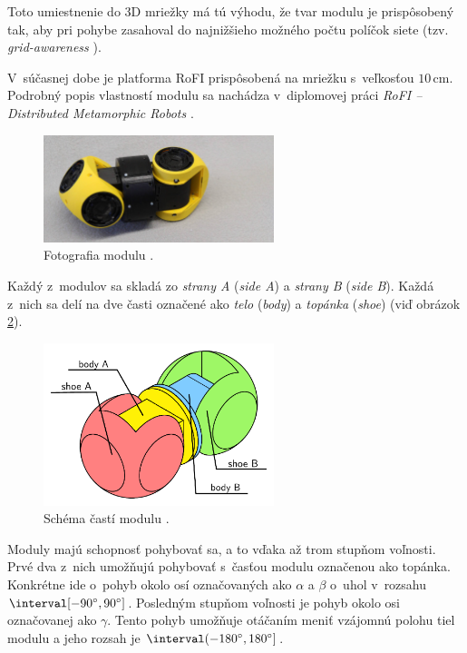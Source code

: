\documentclass[
  printed, %
  oneside, %
  notable,   %
  nolof,     %
  nolot,     %
]{fithesis3}
\begin{document}
Toto umiestnenie do 3D mriežky má tú výhodu, že tvar modulu je prispôsobený tak, aby pri pohybe zasahoval do najnižšieho možného počtu políčok siete (tzv. \textit{grid-awareness} \cite{mrazekMasterThesis}). 

V~súčasnej dobe je platforma RoFI prispôsobená na mriežku s~veľkosťou $10$\,cm. Podrobný popis vlastností modulu sa nachádza v~diplomovej práci \textit{RoFI – Distributed Metamorphic Robots} \cite{mrazekMasterThesis}. 

\begin{figure}[hbt!]
    \centering
    \includegraphics[width=0.6\textwidth]{pictures/module.jpg}
    \caption[Fotografia modulu]{Fotografia modulu \cite{rofiWeb}.}
    \label{fig:module}
\end{figure}

Každý z~modulov sa skladá zo \textit{strany A} (\textit{side A}) a \textit{strany B} (\textit{side B}). Každá z~nich sa delí na dve časti označené ako \textit{telo} (\textit{body}) a \textit{topánka} (\textit{shoe}) (viď obrázok \ref{fig:module_parts}). 

\begin{figure}[hbt!]
    \centering
    \includegraphics[width=0.6\textwidth]{pictures/module_parts.pdf}
    \caption[Časti modulu]{Schéma častí modulu \cite{mrazekMasterThesis}.}
    \label{fig:module_parts}
\end{figure}

Moduly majú schopnosť pohybovať sa, a to vďaka až trom stupňom voľnosti. Prvé dva z~nich umožňujú pohybovať s~časťou modulu označenou ako topánka. Konkrétne ide o~pohyb okolo osí označovaných ako $\alpha$ a $\beta$ o~uhol v~rozsahu $\interval[{-90\degree, 90\degree}]$. Posledným stupňom voľnosti je pohyb okolo osi označovanej ako $\gamma$. Tento pohyb umožňuje otáčaním meniť vzájomnú polohu tiel modulu a jeho rozsah je $\interval({-180\degree, 180\degree}]$. 
\end{document}
